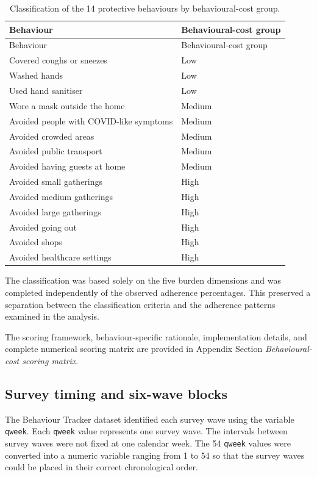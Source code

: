 \documentclass[
  12pt,
  a4paper,
]{article}
\begin{document}
\begin{longtable}[]{@{}ll@{}}
\caption{\label{tab:cost-groups} Classification of the 14 protective behaviours by
behavioural-cost group.}\tabularnewline
\toprule\noalign{}
Behaviour & Behavioural-cost group \\
\midrule\noalign{}
\endfirsthead
\toprule\noalign{}
Behaviour & Behavioural-cost group \\
\midrule\noalign{}
\endhead
\bottomrule\noalign{}
\endlastfoot
Covered coughs or sneezes & Low \\
Washed hands & Low \\
Used hand sanitiser & Low \\
Wore a mask outside the home & Medium \\
Avoided people with COVID-like symptoms & Medium \\
Avoided crowded areas & Medium \\
Avoided public transport & Medium \\
Avoided having guests at home & Medium \\
Avoided small gatherings & High \\
Avoided medium gatherings & High \\
Avoided large gatherings & High \\
Avoided going out & High \\
Avoided shops & High \\
Avoided healthcare settings & High \\
\end{longtable}

The classification was based solely on the five burden dimensions and
was completed independently of the observed adherence percentages. This
preserved a separation between the classification criteria and the
adherence patterns examined in the analysis.

The scoring framework, behaviour-specific rationale, implementation
details, and complete numerical scoring matrix are provided in Appendix
Section \emph{Behavioural-cost scoring matrix}.

\subsection{Survey timing and six-wave blocks}\label{survey-timing-and-six-wave-blocks}

The Behaviour Tracker dataset identified each survey wave using the
variable \texttt{qweek}. Each \texttt{qweek} value represents one survey wave. The
intervals between survey waves were not fixed at one calendar week. The
54 \texttt{qweek} values were converted into a numeric variable ranging from 1
to 54 so that the survey waves could be placed in their correct
chronological order.
\end{document}
